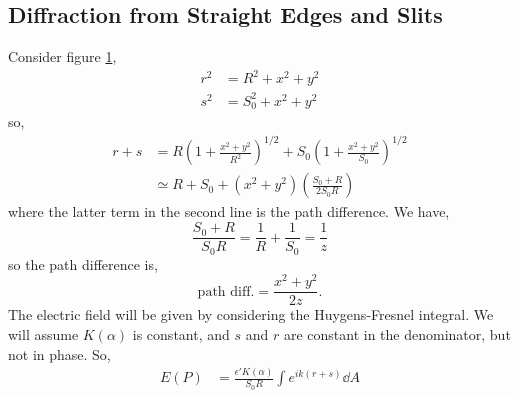\documentclass{book}
\begin{document}
{\subsection{Diffraction from Straight Edges and Slits}
\begin{figure}[h]
	\centering
	\caption{}
	\label{fig:straightedge}
\end{figure}
Consider figure \ref{fig:straightedge},
\begin{align}
	r^2 & = R^2 + x^2 + y^2 \\
	s^2 & = S_0^2 + x^2 + y^2
\end{align}
so,
\begin{equation}
	\begin{split}
	r + s & = R\left(1 + \frac{x^2 + y^2}{R^2}\right)^{1/2} + S_0\left(1+ \frac{x^2  + y^2}{S_0}\right)^{1/2}\\
	& \simeq R+S_0 + (x^2+y^2)\left(\frac{S_0 + R}{2S_0R}\right)
	\end{split}
\end{equation}
where the latter term in the second line is the path difference. We have,
\begin{equation}
	\frac{S_0 + R}{S_0R} = \frac{1}{R} + \frac{1}{S_0} = \frac{1}{z}
\end{equation}
so the path difference is,
\begin{equation}
	\text{path diff.} = \frac{x^2+y^2}{2z}.
\end{equation}
The electric field will be given by considering the Huygens-Fresnel integral. We will assume $K(\alpha)$ is constant, and $s$ and $r$ are constant in the denominator, but not in phase. So,
\begin{equation}
	\begin{split}
	E(P) &= \frac{\epsilon'K(\alpha)}{S_0R}\int e^{ik(r+s)}\dd{A} \\

\end{split}
\end{equation}}
\end{document}
